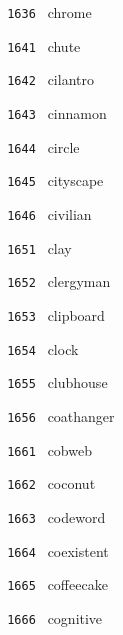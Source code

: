 \documentclass[11pt]{article}
\begin{document}
\begin{multicols}{6}
\noindent \texttt{ 1636 } chrome  \par
\noindent \texttt{ 1641 } chute  \par
\noindent \texttt{ 1642 } cilantro  \par
\noindent \texttt{ 1643 } cinnamon  \par
\noindent \texttt{ 1644 } circle  \par
\noindent \texttt{ 1645 } cityscape  \par
\noindent \texttt{ 1646 } civilian  \par
\noindent \texttt{ 1651 } clay  \par
\noindent \texttt{ 1652 } clergyman  \par
\noindent \texttt{ 1653 } clipboard  \par
\noindent \texttt{ 1654 } clock  \par
\noindent \texttt{ 1655 } clubhouse  \par
\noindent \texttt{ 1656 } coathanger  \par
\noindent \texttt{ 1661 } cobweb  \par
\noindent \texttt{ 1662 } coconut  \par
\noindent \texttt{ 1663 } codeword  \par
\noindent \texttt{ 1664 } coexistent  \par
\noindent \texttt{ 1665 } coffeecake  \par
\noindent \texttt{ 1666 } cognitive  \par
\end{multicols}
\end{document}
